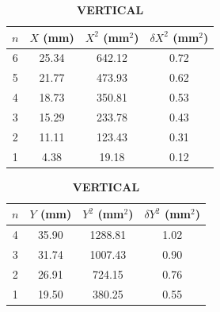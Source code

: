 \documentclass[a4paper,11pt]{article}
\begin{document}
\begin{table}[H]
  \centering
  \caption{3 kg — HORIZONTAL (left) and VERTICAL (right)}\label{tab:3kg-hv}
  \begin{subtable}[t]{0.47\linewidth}
    \centering
    \caption*{\textbf{HORIZONTAL}}\label{tab:3kg-h}
    \begin{tabular}{cccc}
      \toprule
      $n$ & $X$ (mm) & $X^2$ (mm$^2$) & $\delta X^2$ (mm$^2$)\\
      \midrule
       6 & 25.34 &  642.12 & 0.72\\
       5 & 21.77 &  473.93 & 0.62\\
       4 & 18.73 &  350.81 & 0.53\\
       3 & 15.29 &  233.78 & 0.43\\
       2 & 11.11 &  123.43 & 0.31\\
       1 &  4.38 &   19.18 & 0.12\\
      \bottomrule
    \end{tabular}
  \end{subtable}
  \hfill
  \begin{subtable}[t]{0.47\linewidth}
    \centering
    \caption*{\textbf{VERTICAL}}\label{tab:3kg-v}
    \begin{tabular}{cccc}
      \toprule
      $n$ & $Y$ (mm) & $Y^2$ (mm$^2$) & $\delta Y^2$ (mm$^2$)\\
      \midrule
       4 & 35.90 & 1288.81 & 1.02\\
       3 & 31.74 & 1007.43 & 0.90\\
       2 & 26.91 &  724.15 & 0.76\\
       1 & 19.50 &  380.25 & 0.55\\
      \bottomrule
    \end{tabular}
  \end{subtable}
\end{table}
\end{document}
